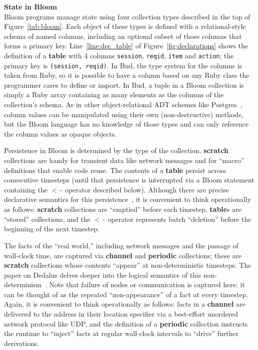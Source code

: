 \noindent\textbf{State in Bloom}\\ \noindent Bloom programs manage state using
four collection types described in the top of Figure~\ref{tab:bloom}. Each
object of these types is defined with a relational-style schema of named
columns, including an optional subset of those columns that forms a primary
key.  Line~\ref{line:dec_table} of Figure~\ref{fig:declarations} shows the
definition of a \textbf{table} with 4 columns \texttt{session}, \texttt{reqid},
\texttt{item} and \texttt{action}; the primary key is \texttt{(session,
reqid)}. In Bud, the type system for the columns is taken from Ruby, so it is
possible to have a column based on any Ruby class the programmer cares to
define or import.  In Bud, a tuple in a Bloom collection is simply a Ruby array
containing as many elements as the columns of the collection's schema.  As in
other object-relational ADT schemes like Postgres~\cite{postgres-adt}, column
values can be manipulated using their own (non-destructive) methods, but the
Bloom language has no knowledge of those types and can only reference the
column values as opaque objects.  

Persistence in Bloom is determined by the type of the collection.
\textbf{scratch} collections are handy for transient data like network messages
and for ``macro'' definitions that enable code reuse. The contents of a
\textbf{table} persist across consecutive timesteps (until that persistence is
interrupted via a Bloom statement containing the \texttt{$<$-} operator
described below). Although there are precise declarative semantics for this
persistence~\cite{dedalus-techr}, it is convenient to think operationally as
follows: \textbf{scratch} collections are ``emptied'' before each timestep,
\textbf{table}s are ``stored'' collections, and the \texttt{$<$-} operator
represents batch ``deletion'' before the beginning of the next timestep.

The facts of the ``real world,'' including network messages and the passage of
wall-clock time, are captured via \textbf{channel} and \textbf{periodic}
collections; these are \textbf{scratch} collections whose contents ``appear''
at non-deterministic timesteps. 
The paper on Dedalus delves deeper into the logical semantics of this
non-determinism~\cite{dedalus-techr}.  Note that failure of nodes or
communication is captured here: it can be thought of as the repeated
``non-appearance'' of a fact at every timestep.  Again, it is convenient to
think operationally as follows: facts in a \textbf{channel} are delivered to
the address in their location specifier via a best-effort unordered network
protocol like UDP, and the definition of a \textbf{periodic} collection
instructs the runtime to ``inject'' facts at regular wall-clock intervals to
``drive'' further derivations.

